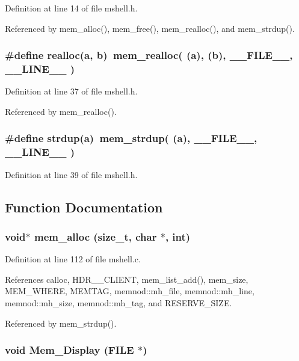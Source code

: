 Definition at line 14 of file mshell.h.

Referenced by mem\_\-alloc(), mem\_\-free(), mem\_\-realloc(), and mem\_\-strdup().
\subsubsection{\setlength{\rightskip}{0pt plus 5cm}\#define realloc(a, b)\ mem\_\-realloc( (a), (b), \_\-\_\-FILE\_\-\_\-, \_\-\_\-LINE\_\-\_\- )}\label{mshell_8h_a3}




Definition at line 37 of file mshell.h.

Referenced by mem\_\-realloc().
\subsubsection{\setlength{\rightskip}{0pt plus 5cm}\#define strdup(a)\ mem\_\-strdup( (a), \_\-\_\-FILE\_\-\_\-, \_\-\_\-LINE\_\-\_\- )}\label{mshell_8h_a5}




Definition at line 39 of file mshell.h.

\subsection{Function Documentation}
\subsubsection{\setlength{\rightskip}{0pt plus 5cm}void$\ast$ mem\_\-alloc (size\_\-t, char $\ast$, int)}\label{mshell_8h_a9}




Definition at line 112 of file mshell.c.

References calloc, HDR\_\_\-CLIENT, mem\_\-list\_\-add(), mem\_\-size, MEM\_\-WHERE, MEMTAG, memnod::mh\_\-file, memnod::mh\_\-line, memnod::mh\_\-size, memnod::mh\_\-tag, and RESERVE\_\-SIZE.

Referenced by mem\_\-strdup().
\subsubsection{\setlength{\rightskip}{0pt plus 5cm}void Mem\_\-Display (FILE $\ast$)}\label{mshell_8h_a8}




